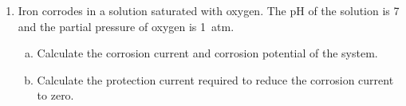 \begin{enumerate}
\begin{enumerate}[(a)]
{\begin{align*}
\Aboxed{\text{CR} &= \SI{3.0e-6}{\milli\meter\per\year}}
\\[1em]
\text{(b) Exchange current density for HER:}\quad
& E_{\text{eq, HER}} = \SI{0}{\volt\ vs.\ RHE} \\
\eta_c &= E_{\text{corr}} - E_{\text{eq, HER}}
= \SI{-0.215}{\volt} \\
\eta_c &= b_c \log\!\left(\frac{i_{\text{corr}}}{i_0^{\text{HER}}}\right) \\
\log\!\left(\frac{i_{\text{corr}}}{i_0^{\text{HER}}}\right)
&= \frac{-0.215}{-0.12} = 1.79 \\
\Aboxed{
i_0^{\text{HER}}
= \frac{2.5\times10^{-7}}{10^{1.79}}
= \SI{4.1e-9}{\ampere\per\centi\meter\squared}}
\end{align*}
}

    \end{enumerate}
    pH = 4, $\alpha_{\ch{Fe^{2+}}} = \SI{0.02}{M}, i_{\ch{Fe}}^O
    = \SI{9e-7}{\ampere\per\centi\meter\squared}$; anodic
    $d\eta / d(\log i) = \SI{0.02}{\volt\per decade}$; the corrosion
    potential of iron is \SI{-0.215}{\volt} vs RHE and
    $e_{\ch{Fe^{2+}}|\ch{Fe}} = \SI{-0.44}{\volt}$ vs. SHE. For the HER
    , the cathodic $d\eta / d(\log i) = \SI{-0.12}{\volt\per decade}$.


\pagebreak

  \item Iron corrodes in a solution saturated with oxygen. The pH of
    the solution
    is 7 and the partial pressure of oxygen is \SI{1}{atm}.
    \begin{enumerate}[(a)]
      \item Calculate the corrosion current and corrosion potential of the
        system.
      \item Calculate the protection current required to reduce the corrosion
        current to zero.
    \end{enumerate}


\end{enumerate}
